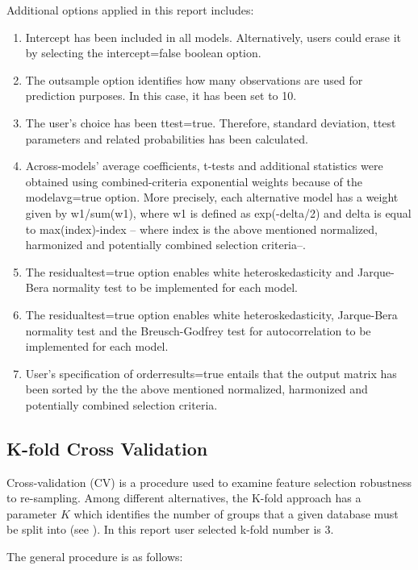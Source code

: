 \documentclass{article}
\begin{document}
Additional options applied in this report includes:

\begin{enumerate}
  \item Intercept has been included in all models. Alternatively, users could erase it by selecting the intercept=false boolean option.
  \item The outsample option identifies how many observations are used for prediction purposes. In this case, it has been set to 10.
  \item The user's choice has been ttest=true. Therefore, standard deviation, ttest parameters and related probabilities has been calculated.
  \item Across-models' average coefficients, t-tests and additional statistics were obtained using combined-criteria exponential weights because of the modelavg=true option. More precisely, each alternative model has a weight given by w1/sum(w1), where w1 is defined as exp(-delta/2) and delta is equal to max(index)-index -- where index is the above mentioned normalized, harmonized and potentially combined selection criteria--.
  \item The residualtest=true option enables white heteroskedasticity and Jarque-Bera normality test to be implemented for each model.
  \item The residualtest=true option enables white heteroskedasticity, Jarque-Bera normality test and the Breusch-Godfrey test for autocorrelation to be implemented for each model.
  \item User's specification of orderresults=true entails that the output matrix has been sorted by the the above mentioned normalized, harmonized and potentially combined selection criteria.
\end{enumerate}
\subsection{K-fold Cross Validation}

Cross-validation (CV) is a procedure used to examine feature selection robustness to re-sampling. Among different alternatives, the K-fold approach has a parameter $K$ which identifies the number of groups that a given database must be split into (see \cite{arlot2010}). In this report user selected k-fold number is 3.

The general procedure is as follows:
\end{document}
